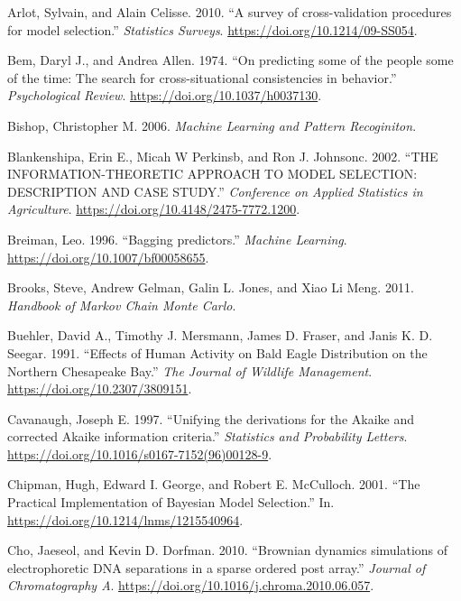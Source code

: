 \documentclass[12pt,]{article}
\begin{document}
\leavevmode\hypertarget{ref-Arlot2010}{}%
Arlot, Sylvain, and Alain Celisse. 2010. ``A survey of cross-validation procedures for model selection.'' \emph{Statistics Surveys}. \url{https://doi.org/10.1214/09-SS054}.

\leavevmode\hypertarget{ref-Bem1974}{}%
Bem, Daryl J., and Andrea Allen. 1974. ``On predicting some of the people some of the time: The search for cross-situational consistencies in behavior.'' \emph{Psychological Review}. \url{https://doi.org/10.1037/h0037130}.

\leavevmode\hypertarget{ref-Bishop2006}{}%
Bishop, Christopher M. 2006. \emph{Machine Learning and Pattern Recoginiton}.

\leavevmode\hypertarget{ref-Blankenshipa2002}{}%
Blankenshipa, Erin E., Micah W Perkinsb, and Ron J. Johnsonc. 2002. ``THE INFORMATION-THEORETIC APPROACH TO MODEL SELECTION: DESCRIPTION AND CASE STUDY.'' \emph{Conference on Applied Statistics in Agriculture}. \url{https://doi.org/10.4148/2475-7772.1200}.

\leavevmode\hypertarget{ref-Breiman1996}{}%
Breiman, Leo. 1996. ``Bagging predictors.'' \emph{Machine Learning}. \url{https://doi.org/10.1007/bf00058655}.

\leavevmode\hypertarget{ref-Brooks2011}{}%
Brooks, Steve, Andrew Gelman, Galin L. Jones, and Xiao Li Meng. 2011. \emph{Handbook of Markov Chain Monte Carlo}.

\leavevmode\hypertarget{ref-Buehler1991}{}%
Buehler, David A., Timothy J. Mersmann, James D. Fraser, and Janis K. D. Seegar. 1991. ``Effects of Human Activity on Bald Eagle Distribution on the Northern Chesapeake Bay.'' \emph{The Journal of Wildlife Management}. \url{https://doi.org/10.2307/3809151}.

\leavevmode\hypertarget{ref-Cavanaugh1997}{}%
Cavanaugh, Joseph E. 1997. ``Unifying the derivations for the Akaike and corrected Akaike information criteria.'' \emph{Statistics and Probability Letters}. \url{https://doi.org/10.1016/s0167-7152(96)00128-9}.

\leavevmode\hypertarget{ref-Chipman2001}{}%
Chipman, Hugh, Edward I. George, and Robert E. McCulloch. 2001. ``The Practical Implementation of Bayesian Model Selection.'' In. \url{https://doi.org/10.1214/lnms/1215540964}.

\leavevmode\hypertarget{ref-Cho2010}{}%
Cho, Jaeseol, and Kevin D. Dorfman. 2010. ``Brownian dynamics simulations of electrophoretic DNA separations in a sparse ordered post array.'' \emph{Journal of Chromatography A}. \url{https://doi.org/10.1016/j.chroma.2010.06.057}.
\end{document}
